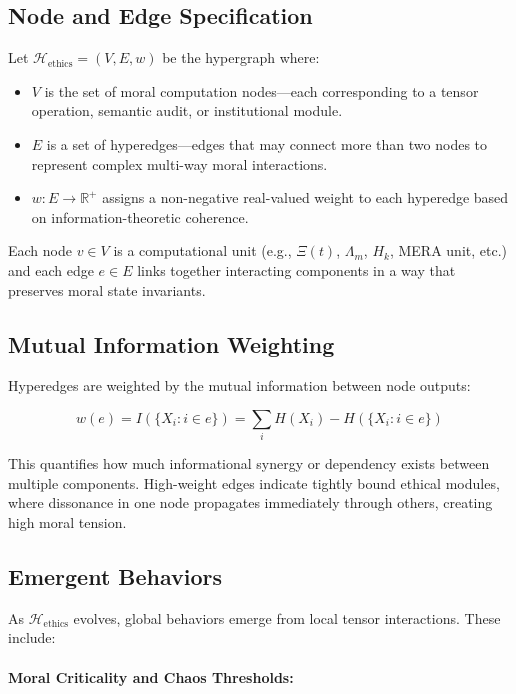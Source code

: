 \documentclass[12]{amsart}
\theoremstyle{plain}
\begin{document}
\subsection{Node and Edge Specification}

Let \(\mathcal{H}_{\text{ethics}} = (V, E, w)\) be the hypergraph where:

\begin{itemize}
    \item \(V\) is the set of moral computation nodes—each corresponding to a tensor operation, semantic audit, or institutional module.
    \item \(E\) is a set of hyperedges—edges that may connect more than two nodes to represent complex multi-way moral interactions.
    \item \(w: E \rightarrow \mathbb{R}^+\) assigns a non-negative real-valued weight to each hyperedge based on information-theoretic coherence.
\end{itemize}

Each node \(v \in V\) is a computational unit (e.g., \(\Xi(t)\), \(\Lambda_m\), \(H_k\), MERA unit, etc.) and each edge \(e \in E\) links together interacting components in a way that preserves moral state invariants.

\subsection{Mutual Information Weighting}

Hyperedges are weighted by the mutual information between node outputs:

\[
w(e) = I(\{X_i : i \in e\}) = \sum_{i} H(X_i) - H(\{X_i : i \in e\})
\]

This quantifies how much informational synergy or dependency exists between multiple components. High-weight edges indicate tightly bound ethical modules, where dissonance in one node propagates immediately through others, creating high moral tension.

\subsection{Emergent Behaviors}

As \(\mathcal{H}_{\text{ethics}}\) evolves, global behaviors emerge from local tensor interactions. These include:

\paragraph{Moral Criticality and Chaos Thresholds:}
\end{document}
